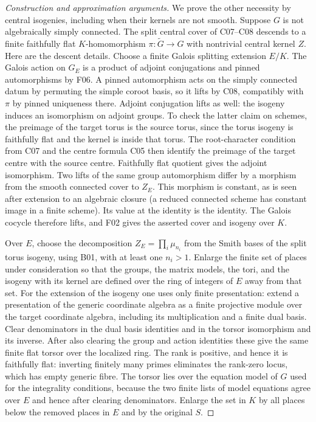 \documentclass[11pt,a4paper,openany,oneside]{book}
\theoremstyle{resultstyle}
\theoremstyle{definition}
\numberwithin{equation}{chapter}
\begin{document}
\begin{proof}[Construction and approximation arguments]
We prove the other necessity by central isogenies, including
when their kernels are not smooth. Suppose $G$ is not
algebraically simply connected. The split central cover
of C07--C08 descends to a finite faithfully flat
$K$-homomorphism $\pi:\widetilde G\to G$ with nontrivial
central kernel $Z$. Here are the descent details. Choose
a finite Galois splitting extension $E/K$. The Galois
action on $G_E$ is a product of adjoint conjugations and
pinned automorphisms by F06. A pinned automorphism acts
on the simply connected datum by permuting the simple
coroot basis, so it lifts by C08, compatibly with $\pi$
by pinned uniqueness there. Adjoint conjugation lifts
as well: the isogeny induces an isomorphism on adjoint
groups. To check the latter claim on schemes, the
preimage of the target torus is the source torus,
since the torus isogeny is faithfully flat and the
kernel is inside that torus. The root-character
condition from C07 and the centre formula C05 then
identify the preimage of the target centre with the
source centre. Faithfully flat quotient gives the
adjoint isomorphism. Two lifts of the same group
automorphism differ by a morphism from the smooth
connected cover to $Z_E$. This morphism is constant,
as is seen after extension to an algebraic closure
(a reduced connected scheme has constant image in a
finite scheme). Its value at the identity is the
identity. The Galois cocycle therefore lifts, and
F02 gives the asserted cover and isogeny over $K$.

Over $E$, choose the decomposition $Z_E=\prod_i\mu_{n_i}$
from the Smith bases of the split torus isogeny, using B01,
with at least one $n_i>1$. Enlarge the finite set
of places under consideration so that the groups,
the matrix models, the tori, and the isogeny with its
kernel are defined over the ring of integers of $E$
away from that set. For the extension of the isogeny
one uses only finite presentation: extend a presentation
of the generic coordinate algebra as a finite projective
module over the target coordinate algebra, including
its multiplication and a finite dual basis. Clear
denominators in the dual basis identities and in the
torsor isomorphism and its inverse. After also clearing
the group and action identities these give the same
finite flat torsor over the localized ring. The rank is
positive, and hence it is faithfully flat: inverting
finitely many primes eliminates the rank-zero locus,
which has empty generic fibre. The torsor lies over
the equation model of $G$ used for the integrality
conditions, because the two finite lists of model
equations agree over $E$ and hence after clearing
denominators. Enlarge the set in $K$ by all places below
the removed places in $E$ and by the original $S$.


\end{proof}
\end{document}
